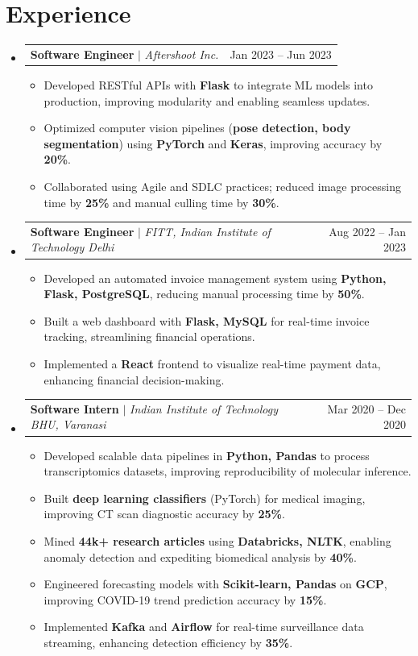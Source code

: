 \documentclass[letterpaper,10pt]{article}
\makeatletter
\newcommand{\resumeItem}[1]{
  \item[$\vcenter{\hbox{\tiny$\bullet$}}$]\small{
    #1 \vspace{-2pt}
  }
}
\newcommand{\resumeProjectHeading}[2]{
  \item
  \begin{tabular*}{0.97\textwidth}{l@{\extracolsep{\fill}}r}
    \small#1 & #2 \\
  \end{tabular*}\vspace{-7pt}
}
\newcommand{\resumeSubHeadingListStart}{\begin{itemize}[leftmargin=0.15in, label={}]}
\newcommand{\resumeSubHeadingListEnd}{\end{itemize}}
\newcommand{\resumeItemListStart}{\begin{itemize}}
\newcommand{\resumeItemListEnd}{\end{itemize}\vspace{-5pt}}
\makeatother
\begin{document}
\section{\textbf{Experience}}
\resumeSubHeadingListStart

\resumeProjectHeading
{\textbf{Software Engineer} $|$ \emph{Aftershoot Inc.}}{Jan 2023 – Jun 2023}
\resumeItemListStart
  \resumeItem{Developed RESTful APIs with \textbf{Flask} to integrate ML models into production, improving modularity and enabling seamless updates.}
  \resumeItem{Optimized computer vision pipelines (\textbf{pose detection, body segmentation}) using \textbf{PyTorch} and \textbf{Keras}, improving accuracy by \textbf{20\%}.}
  \resumeItem{Collaborated using Agile and SDLC practices; reduced image processing time by \textbf{25\%} and manual culling time by \textbf{30\%}.}
\resumeItemListEnd

\resumeProjectHeading
{\textbf{Software Engineer} $|$ \emph{FITT, Indian Institute of Technology Delhi}}{Aug 2022 – Jan 2023}
\resumeItemListStart
  \resumeItem{Developed an automated invoice management system using \textbf{Python, Flask, PostgreSQL}, reducing manual processing time by \textbf{50\%}.}
  \resumeItem{Built a web dashboard with \textbf{Flask, MySQL} for real-time invoice tracking, streamlining financial operations.}
  \resumeItem{Implemented a \textbf{React} frontend to visualize real-time payment data, enhancing financial decision-making.}
\resumeItemListEnd

\resumeProjectHeading
{\textbf{Software Intern} $|$ \emph{Indian Institute of Technology BHU, Varanasi}}{Mar 2020 – Dec 2020}
\resumeItemListStart
  \resumeItem{Developed scalable data pipelines in \textbf{Python, Pandas} to process transcriptomics datasets, improving reproducibility of molecular inference.}
  \resumeItem{Built \textbf{deep learning classifiers} (PyTorch) for medical imaging, improving CT scan diagnostic accuracy by \textbf{25\%}.}
  \resumeItem{Mined \textbf{44k+ research articles} using \textbf{Databricks, NLTK}, enabling anomaly detection and expediting biomedical analysis by \textbf{40\%}.}
  \resumeItem{Engineered forecasting models with \textbf{Scikit-learn, Pandas} on \textbf{GCP}, improving COVID-19 trend prediction accuracy by \textbf{15\%}.}
  \resumeItem{Implemented \textbf{Kafka} and \textbf{Airflow} for real-time surveillance data streaming, enhancing detection efficiency by \textbf{35\%}.}
\resumeItemListEnd

\resumeSubHeadingListEnd
\end{document}

